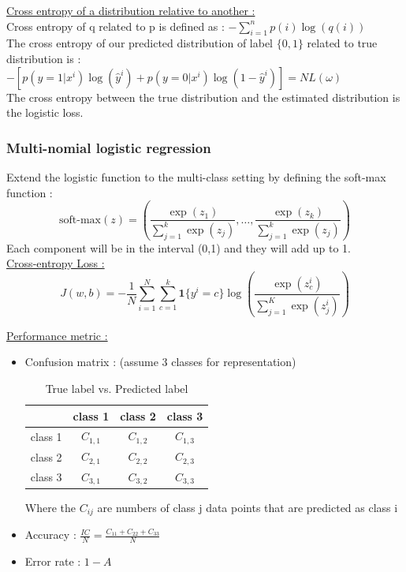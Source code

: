 \documentclass[../main.tex]{subfiles}
\begin{document}
\quad \underline{Cross entropy of a distribution relative to another :}\\
Cross entropy of q related to p is defined as : $-\sum_{i=1}^n p(i)\log(q(i))$\\
The cross entropy of our predicted distribution of label $\{0,1\}$ related to true distribution is : \\
$-[p(y=1| x^i)\log(\hat{y}^i) + p(y=0|x^i) \log(1-\hat{y}^i)] = N L(\omega)$\\

The cross entropy between the true distribution and the estimated distribution is the logistic loss.\\

\subsubsection{Multi-nomial logistic regression}

Extend the logistic function to the multi-class setting by defining the soft-max function : \begin{equation}
    \text{soft-max}(z) = (\frac{\exp(z_1)}{\sum_{j=1}^k \exp(z_j)},\dots, \frac{\exp(z_k)}{\sum_{j=1}^k \exp(z_j)})
\end{equation}
Each component will be in the interval (0,1) and they will add up to 1.\\

\underline{Cross-entropy Loss :}\begin{equation}
    J(w,b) = -\frac{1}{N} \sum_{i=1}^N \sum_{c=1}^k \mathbf{1}\{y^i=c\} \log(\frac{\exp(z^i_c)}{\sum_{j=1}^K\exp(z^i_j)})
\end{equation}

\quad \underline{Performance metric :}\\
\begin{itemize}
    \item Confusion matrix : (assume 3 classes for representation) \begin{table}[hbt!]
        \centering
        \begin{tabular}{|c||c|c|c|}
        \hline
         & class 1 & class 2 & class 3\\    \hline     \hline
        class 1 & $C_{1,1}$ & $C_{1,2}$ & $C_{1,3}$ \\ \hline
        class 2 & $C_{2,1}$ & $C_{2,2}$ & $C_{2,3}$ \\ \hline
        class 3 & $C_{3,1}$ & $C_{3,2}$ & $C_{3,3}$\\ \hline
        \end{tabular}
        \caption{True label vs. Predicted label}
    \end{table}
    Where the $C_{ij}$ are numbers of class j data points that are predicted as class i\\
    \item Accuracy : $\frac{IC}{N} = \frac{C_{11} + C_{22}+C_{33}}{N}$\\
    \item Error rate : $1-A$\\
\end{itemize}
\end{document}
